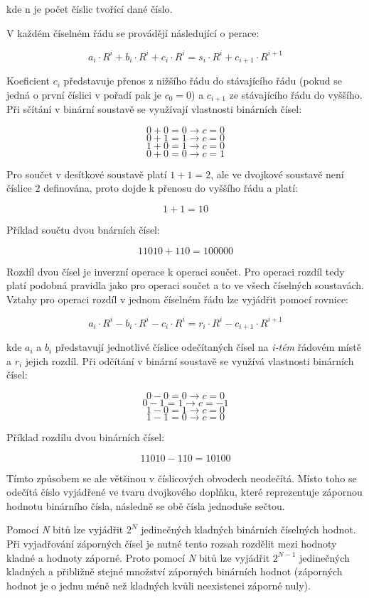 kde n je počet číslic tvořící dané číslo.

V každém číselném řádu se provádějí následující o perace:

$$ a_i \cdot R^i + b_i \cdot R^i + c_i \cdot R^i = s_i \cdot R^i + c_{i+1} \cdot R^{i+1} $$

Koeficient $c_i$ představuje přenos z nižšího řádu do stávajícího řádu (pokud se jedná o první číslici v pořadí pak je $c_0 = 0$) a $c_{i+1}$ ze stávajícího řádu do vyššího. Při sčítání v binární soustavě se využívají vlastnosti binárních čísel:

$$ 0 + 0 = 0 \rightarrow c = 0 $$
$$ 0 + 1 = 1 \rightarrow c = 0 $$
$$ 1 + 0 = 1 \rightarrow c = 0 $$
$$ 0 + 0 = 0 \rightarrow c = 1 $$

Pro součet v desítkové soustavě platí $1 + 1 = 2$, ale ve dvojkové soustavě není číslice $2$ definována, proto dojde k přenosu do vyššího řádu a platí:

$$1+1 = 10$$

Příklad součtu dvou bnárních čísel:

$$ 11010 + 110 = 100000$$


Rozdíl dvou čísel je inverzní operace k operaci součet. Pro operaci rozdíl tedy platí podobná pravidla jako pro operaci součet a to ve všech číselných soustavách. Vztahy pro operaci rozdíl v jednom číselném řádu lze vyjádřit pomocí rovnice:

$$ a_i \cdot R^i - b_i \cdot R^i - c_i \cdot R^i = r_i \cdot R^i - c_{i+1} \cdot R^{i+1} $$

kde $a_i$ a $b_i$ představují jednotlivé číslice odečítaných čísel na {\it i-tém} řádovém místě a $r_i$ jejich rozdíl. Při odčítání v binární soustavě se využívá vlastnosti binárních čísel:

$$ 0 - 0 = 0 \rightarrow c = 0 $$
$$ 0 - 1 = 1 \rightarrow c = -1 $$
$$ 1 - 0 = 1 \rightarrow c = 0 $$
$$ 1 - 1 = 0 \rightarrow c = 0 $$

Příklad rozdílu dvou binárních čísel:

$$11010 - 110 = 10100 $$

Tímto způsobem se ale většinou v číslicových obvodech neodečítá. Místo toho se odečítá číslo vyjádřené ve tvaru dvojkového doplňku, které reprezentuje zápornou hodnotu binárního čísla, následně se obě čísla jednoduše sečtou.


Pomocí {\it N} bitů lze vyjádřit $2^N$ jedinečných kladných binárních číselných hodnot. Při vyjadřování záporných čísel je nutné tento rozsah rozdělit mezi hodnoty kladné a hodnoty záporné. Proto pomocí {\it N} bitů lze vyjádřit $2^{N-1}$ jedinečných kladných a přibližně stejné množství záporných binárních hodnot (záporných hodnot je o jednu méně než kladných kvůli neexistenci záporné nuly).

